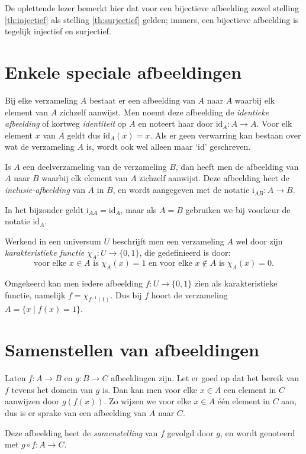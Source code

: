 De oplettende lezer bemerkt hier dat voor een bijectieve afbeelding zowel stelling \ref{th:injectief} als stelling \ref{th:surjectief} gelden; immers, een bijectieve afbeelding is tegelijk injectief en surjectief.

\section{Enkele speciale afbeeldingen}
Bij elke verzameling $A$ bestaat er een afbeelding van $A$ naar $A$ waarbij elk element van $A$ zichzelf aanwijst. Men noemt deze afbeelding de \textit{identieke afbeelding} of kortweg \textit{identiteit} op $A$ en noteert haar door $\text{id}_A: A\rightarrow A$. Voor elk element $x$ van $A$ geldt dus $\text{id}_A(x)=x$. Als er geen verwarring kan bestaan over wat de verzameling $A$ is, wordt ook wel alleen maar `id' geschreven.

Is $A$ een deelverzameling van de verzameling $B$, dan heeft men de afbeelding van $A$ naar $B$ waarbij elk element van $A$ zichzelf aanwijst. Deze afbeelding heet de \textit{inclusie-afbeelding} van $A$ in $B$, en wordt aangegeven met de notatie $\text{i}_{AB}:A\rightarrow B$. 

In het bijzonder geldt $\text{i}_{AA}=\text{id}_A$, maar als $A=B$ gebruiken we bij voorkeur de notatie $\text{id}_A$.

Werkend in een universum $U$ beschrijft men een verzameling $A$ wel door zijn \textit{karakteristieke functie} $\chi_A:U\rightarrow\{0,1\}$, die gedefinieerd is door:
$$\text{voor elke }x\in A\text{ is }\chi_A(x)=1\text{ en voor elke }x\not\in A\text{ is }\chi_A(x)=0.$$

Omgekeerd kan men iedere afbeelding $f:U\rightarrow\{0,1\}$ zien als karakteristieke functie, namelijk $f=\chi_{f^{-1}(1)}$. Dus bij $f$ hoort de verzameling $A=\{x\;|\;f(x)=1\}$.

\section{Samenstellen van afbeeldingen}
Laten $f:A\rightarrow B$ en $g:B\rightarrow C$ afbeeldingen zijn. Let er goed op dat het bereik van $f$ tevens het domein van $g$ is. Dan kan men voor elke $x\in A$ een element in $C$ aanwijzen door $g(f(x))$. Zo wijzen we voor elke $x\in A$ \'e\'en element in $C$ aan, dus is er sprake van een afbeelding van $A$ naar $C$.

Deze afbeelding heet de \textit{samenstelling} van $f$ gevolgd door $g$, en wordt genoteerd met $g\circ f:A\rightarrow C$.

